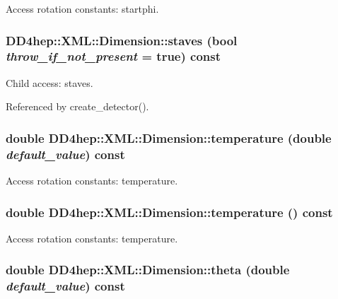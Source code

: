 Access rotation constants: startphi. \hypertarget{struct_d_d4hep_1_1_x_m_l_1_1_dimension_a7f07e3e3003710147718bab54c2dfd3e}{
\subsubsection[{staves}]{ DD4hep::XML::Dimension::staves (bool {\em throw\_\-if\_\-not\_\-present} = {\ttfamily true}) const}}
\label{struct_d_d4hep_1_1_x_m_l_1_1_dimension_a7f07e3e3003710147718bab54c2dfd3e}


Child access: staves. 

Referenced by create\_\-detector().\hypertarget{struct_d_d4hep_1_1_x_m_l_1_1_dimension_ae6862cd516abc3114596dd7a77c3ca61}{
\subsubsection[{temperature}]{\setlength{\rightskip}{0pt plus 5cm}double DD4hep::XML::Dimension::temperature (double {\em default\_\-value}) const}}
\label{struct_d_d4hep_1_1_x_m_l_1_1_dimension_ae6862cd516abc3114596dd7a77c3ca61}


Access rotation constants: temperature. \hypertarget{struct_d_d4hep_1_1_x_m_l_1_1_dimension_ad8aabbcaefc74e0a5155434c6ecdcab4}{
\subsubsection[{temperature}]{\setlength{\rightskip}{0pt plus 5cm}double DD4hep::XML::Dimension::temperature () const}}
\label{struct_d_d4hep_1_1_x_m_l_1_1_dimension_ad8aabbcaefc74e0a5155434c6ecdcab4}


Access rotation constants: temperature. \hypertarget{struct_d_d4hep_1_1_x_m_l_1_1_dimension_a2f5a8493ac129c76a5c8af329ea9a691}{
\subsubsection[{theta}]{\setlength{\rightskip}{0pt plus 5cm}double DD4hep::XML::Dimension::theta (double {\em default\_\-value}) const}}
\label{struct_d_d4hep_1_1_x_m_l_1_1_dimension_a2f5a8493ac129c76a5c8af329ea9a691}


